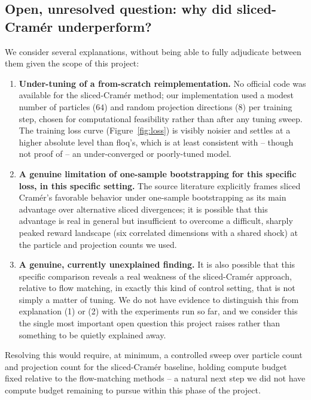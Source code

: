 \documentclass[11pt]{article}
\begin{document}
\subsection{Open, unresolved question: why did sliced-Cram\'er underperform?}
We consider several explanations, without being able to fully adjudicate between them given the scope of this project:
\begin{enumerate}[leftmargin=*]
\item \textbf{Under-tuning of a from-scratch reimplementation.} No official code was available for the sliced-Cram\'er method; our implementation used a modest number of particles ($64$) and random projection directions ($8$) per training step, chosen for computational feasibility rather than after any tuning sweep. The training loss curve (Figure~\ref{fig:loss}) is visibly noisier and settles at a higher absolute level than floq's, which is at least consistent with -- though not proof of -- an under-converged or poorly-tuned model.
\item \textbf{A genuine limitation of one-sample bootstrapping for this specific loss, in this specific setting.} The source literature explicitly frames sliced Cram\'er's favorable behavior under one-sample bootstrapping as its main advantage over alternative sliced divergences; it is possible that this advantage is real in general but insufficient to overcome a difficult, sharply peaked reward landscape (six correlated dimensions with a shared shock) at the particle and projection counts we used.
\item \textbf{A genuine, currently unexplained finding.} It is also possible that this specific comparison reveals a real weakness of the sliced-Cram\'er approach, relative to flow matching, in exactly this kind of control setting, that is not simply a matter of tuning. We do not have evidence to distinguish this from explanation (1) or (2) with the experiments run so far, and we consider this the single most important open question this project raises rather than something to be quietly explained away.
\end{enumerate}
Resolving this would require, at minimum, a controlled sweep over particle count and projection count for the sliced-Cram\'er baseline, holding compute budget fixed relative to the flow-matching methods -- a natural next step we did not have compute budget remaining to pursue within this phase of the project.
\end{document}
